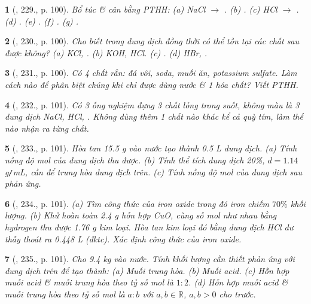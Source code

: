 \documentclass{article}
\newtheorem{baitoan}{}
\begin{document}
\begin{baitoan}[\cite{Nguyen_Buu_Can_500_BT_Hoa_Hoc_THCS}, 229., p. 100]
	Bổ túc \& cân bằng {\rm PTHH}: {\rm(a) NaCl $\to$ . (b) . (c) HCl $\to$ . (d) . (e) . (f) . (g) }.
\end{baitoan}

\begin{baitoan}[\cite{Nguyen_Buu_Can_500_BT_Hoa_Hoc_THCS}, 230., p. 100]
	Cho biết trong dung dịch đồng thời có thể tồn tại các chất sau được không? {\rm(a) KCl, . (b) KOH, HCl. (c) . (d) HBr, }.
\end{baitoan}

\begin{baitoan}[\cite{Nguyen_Buu_Can_500_BT_Hoa_Hoc_THCS}, 231., p. 100]
	Có 4 chất rắn: đá vôi, soda, muối ăn, potassium sulfate. Làm cách nào để phân biệt chúng khi chỉ được dùng nước \& 1 hóa chất? Viết {\rm PTHH}.
\end{baitoan}

\begin{baitoan}[\cite{Nguyen_Buu_Can_500_BT_Hoa_Hoc_THCS}, 232., p. 101]
	Có 3 ống nghiệm đựng 3 chất lỏng trong suốt, không màu là 3 dung dịch {\rm NaCl, HCl, }. Không dùng thêm 1 chất nào khác kể cả quỳ tím, làm thế nào nhận ra từng chất.
\end{baitoan}

\begin{baitoan}[\cite{Nguyen_Buu_Can_500_BT_Hoa_Hoc_THCS}, 233., p. 101]
	Hòa tan {\rm15.5 g } vào nước tạo thành {\rm0.5 L} dung dịch. (a) Tính nồng độ mol của dung dịch thu được. (b) Tính thể tích dung dịch {\rm{} 20\%}, $d = 1.14$ {\rm g{\tt/}mL}, cần để trung hòa dung dịch trên. (c) Tính nồng độ mol của dung dịch sau phản ứng.
\end{baitoan}

\begin{baitoan}[\cite{Nguyen_Buu_Can_500_BT_Hoa_Hoc_THCS}, 234., p. 101]
	(a) Tìm công thức của iron oxide trong đó iron chiếm $70\%$ khối lượng. (b) Khử hoàn toàn {\rm2.4 g} hỗn hợp {\rm CuO, } cùng số mol như nhau bằng hydrogen thu được {\rm1.76 g} kim loại. Hòa tan kim loại đó bằng dung dịch {\rm HCl} dư thấy thoát ra {\rm0.448 L } (đktc). Xác định công thức của iron oxide.
\end{baitoan}

\begin{baitoan}[\cite{Nguyen_Buu_Can_500_BT_Hoa_Hoc_THCS}, 235., p. 101]
	Cho {\rm9.4 kg } vào nước. Tính khối lượng {\rm{}} cần thiết phản ứng với dung dịch trên để tạo thành: (a) Muối trung hòa. (b) Muối acid. (c) Hỗn hợp muối acid \& muối trung hòa theo tỷ số mol là $1:2$. (d) Hỗn hợp muối acid \& muối trung hòa theo tỷ số mol là $a:b$ với $a,b\in\mathbb{R}$, $a,b > 0$ cho trước.
\end{baitoan}
\end{document}
